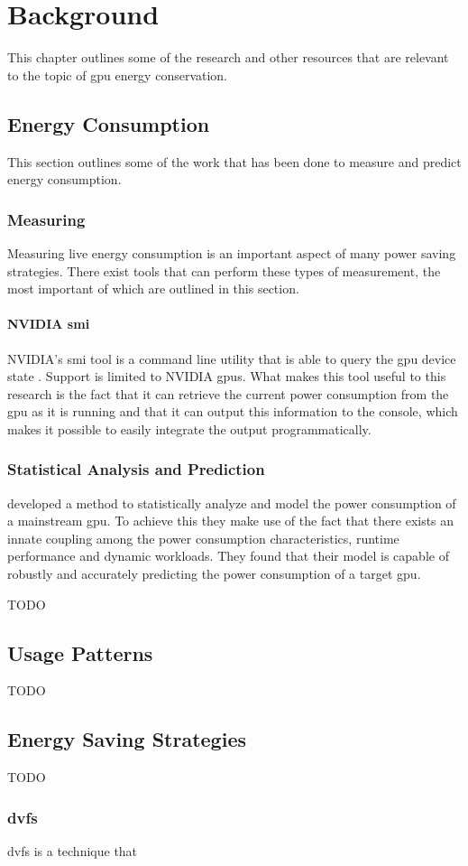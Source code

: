 \chapter{Background}
	This chapter outlines some of the research and other resources that are relevant to the topic of \gls{gpu} energy conservation.

	\section{Energy Consumption}
		This section outlines some of the work that has been done to measure and predict energy consumption.

		\subsection{Measuring}
			Measuring live energy consumption is an important aspect of many power saving strategies.
			There exist tools that can perform these types of measurement, the most important of which are outlined in this section.

			\subsubsection{NVIDIA \acrlong{smi}}
				NVIDIA's \gls{smi} tool is a command line utility that is able to query the \gls{gpu} device state \parencite{NVIDIA}.
				Support is limited to NVIDIA \glspl{gpu}.
				What makes this tool useful to this research is the fact that it can retrieve the current power consumption from the \gls{gpu} as it is running and that it can output this information to the console, which makes it possible to easily integrate the output programmatically.

		\subsection{Statistical Analysis and Prediction}
			\textcite{Ma2009} developed a method to statistically analyze and model the power consumption of a mainstream \gls{gpu}.
			To achieve this they make use of the fact that there exists an innate coupling among the power consumption characteristics, runtime performance and dynamic workloads.
			They found that their model is capable of robustly and accurately predicting the power consumption of a target \gls{gpu}.

			\textcite{Chen2011} TODO

	\section{Usage Patterns}
		TODO

	\section{Energy Saving Strategies}
		TODO

		\subsection{\acrlong{dvfs}}
			\gls{dvfs} is a technique that